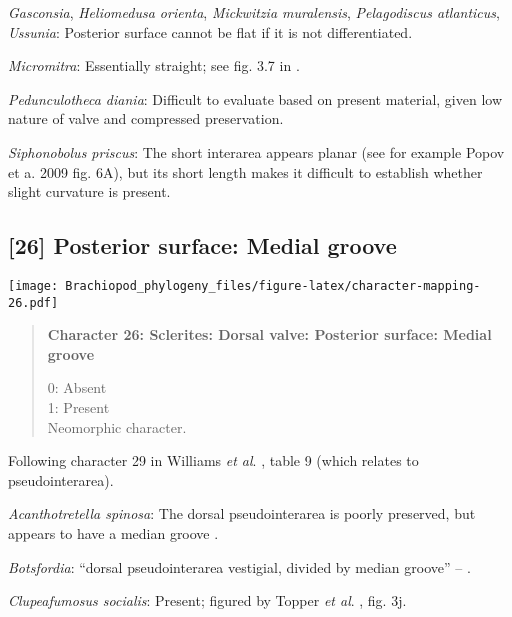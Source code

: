 \documentclass[openany]{book}
\theoremstyle{definition}
\theoremstyle{definition}
\theoremstyle{definition}
\theoremstyle{remark}
\begin{document}
\hypertarget{Gasconsia-coding-25}{}
\emph{Gasconsia}, \emph{Heliomedusa orienta}, \emph{Mickwitzia
muralensis}, \emph{Pelagodiscus atlanticus}, \emph{Ussunia}: Posterior
surface cannot be flat if it is not differentiated.

\hypertarget{Micromitra-coding-25}{}
\emph{Micromitra}: Essentially straight; see fig. 3.7 in
\citet{Ushatinskaya2016Protegulumand}.

\hypertarget{Pedunculotheca_diania-coding-25}{}
\emph{Pedunculotheca diania}: Difficult to evaluate based on present
material, given low nature of valve and compressed preservation.

\hypertarget{Siphonobolus_priscus-coding-25}{}
\emph{Siphonobolus priscus}: The short interarea appears planar (see for
example Popov et a. 2009 fig. 6A), but its short length makes it
difficult to establish whether slight curvature is present.

\subsection*{{[}26{]} Posterior surface: Medial
groove}\label{posterior-surface-medial-groove}

\texttt{[image: Brachiopod\_phylogeny\_files/figure-latex/character-mapping-26.pdf]}

\begin{quote}
\textbf{Character 26: Sclerites: Dorsal valve: Posterior surface: Medial
groove}

0: Absent\\
1: Present\\
Neomorphic character.
\end{quote}

Following character 29 in Williams \emph{et al}.
\citeyearpar{Williams2000LinguliformeaCraniiformea}, table 9 (which
relates to pseudointerarea).

\hypertarget{Acanthotretella_spinosa-coding-26}{}
\emph{Acanthotretella spinosa}: The dorsal pseudointerarea is poorly
preserved, but appears to have a median groove
\citep{Holmer2006Aspinose}.

\hypertarget{Botsfordia-coding-26}{}
\emph{Botsfordia}: ``dorsal pseudointerarea vestigial, divided by median
groove'' -- \citet{Williams2000LinguliformeaCraniiformea}.

\hypertarget{Clupeafumosus_socialis-coding-26}{}
\emph{Clupeafumosus socialis}: Present; figured by Topper \emph{et al}.
\citeyearpar{Topper2013Reappraisalof}, fig. 3j.
\end{document}
